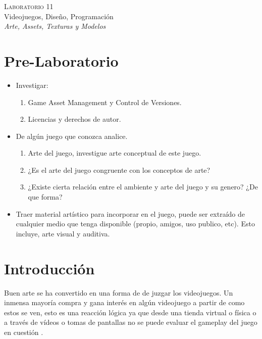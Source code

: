\begin{center}
\textsc{\Large Laboratorio 11}~\\
{\large Videojuegos, Diseño, Programación}~\\
\emph{Arte, Assets, Texturas y Modelos}
\end{center}

\section{Pre-Laboratorio}
\begin{itemize}
\item Investigar:
\begin{enumerate}
  \item Game Asset Management y Control de Versiones.
  \item Licencias y derechos de autor.
\end{enumerate}
\item De algún juego que conozca analice.
\begin{enumerate}
  \item Arte del juego, investigue arte conceptual de este juego.
  \item ¿Es el arte del juego congruente con los conceptos de arte?
  \item ¿Existe cierta relación entre el ambiente y arte del juego y su genero? ¿De que forma?
\end{enumerate}
\item Traer material artístico para incorporar en el juego, puede ser extraído de cualquier medio que tenga disponible (propio, amigos, uso publico, etc). Esto incluye, arte visual y auditiva.
\end{itemize}

\setlength\intextsep{0pt}
\section{Introducción}
Buen arte se ha convertido en una forma de de juzgar los videojuegos. Un inmensa mayoría compra y gana interés en algún videojuego a partir de como estos se ven, esto es una reacción lógica ya que desde una tienda virtual o física o a través de vídeos o tomas de pantallas no se puede evaluar el gameplay del juego en cuestión \cite[p.~171]{bobbatesgamedesign}.


